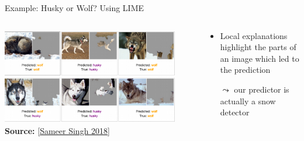 \documentclass[11pt,compress,t,notes=noshow, aspectratio=169, xcolor=table]{beamer}
\begin{document}
\begin{frame}[c]{Example: Husky or Wolf? Using LIME}

	\begin{columns}
	
	\begin{column}{0.7\textwidth}
	    
	\begin{center}
		\includegraphics[width=0.9\textwidth]{figure/lime-wolfhusky3.png}\\
		{\textbf{Source:} [\href{http://www.facweb.iitkgp.ac.in/~niloy/COURSE/Spring2018/IntelligentSystem/PPT_2018/why_should_i_trust_ppt.pdf}{Sameer Singh 2018}]}
	\end{center}
	    
	\end{column}
	
	\begin{column}{0.3\textwidth}
	    
	\begin{itemize}
		\item Local explanations highlight the parts of an image which led to the prediction
		\item[$\leadsto$] our predictor is actually a snow detector 
	\end{itemize}
	    
	\end{column}
	    
	\end{columns}







\end{frame}
\end{document}
